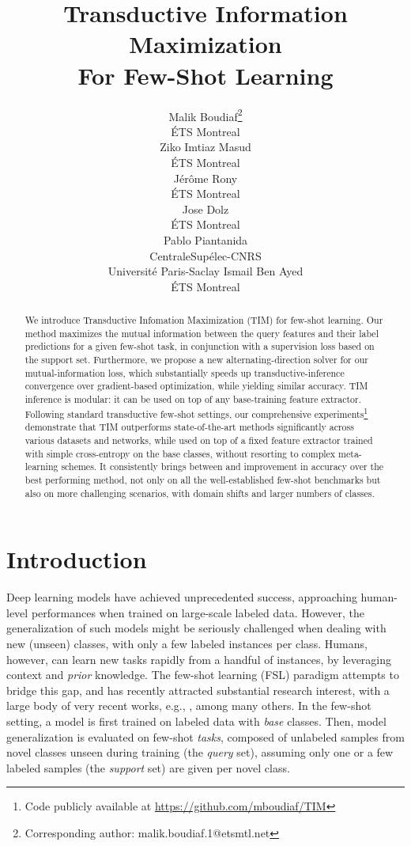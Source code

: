 \documentclass{article}
\title{Transductive Information Maximization \\ For Few-Shot Learning}
\author{Malik Boudiaf\thanks{Corresponding author: malik.boudiaf.1@etsmtl.net} \\
  \'ETS Montreal \\
\And
  Ziko Imtiaz Masud \\
  \'ETS Montreal \\
  \And
  Jérôme Rony \\
  \'ETS Montreal \\
  \AND
  Jose Dolz \\
  \'ETS Montreal \\
  \And
  Pablo Piantanida \\
  CentraleSup\'elec-CNRS \\ Universit\'e Paris-Saclay 
  \And
  Ismail Ben Ayed \\
  \'ETS Montreal \\
}
\begin{document}
\maketitle
\begin{abstract}


We introduce Transductive Infomation Maximization (TIM) for few-shot learning. Our method maximizes the mutual information between the query features and their label predictions for a given few-shot task, in conjunction with a supervision loss based on the support set. Furthermore, we propose a new alternating-direction solver for our mutual-information loss, which substantially speeds up transductive-inference convergence over gradient-based optimization, while yielding similar accuracy. 
TIM inference is modular: it can be used on top of any base-training feature extractor. 
Following standard transductive few-shot settings, our comprehensive experiments\footnote{Code publicly available at \url{https://github.com/mboudiaf/TIM}} demonstrate that TIM outperforms state-of-the-art methods significantly across various datasets and networks, while used on top of a fixed feature extractor trained with simple cross-entropy on the base classes, without resorting to complex meta-learning schemes. It consistently brings between  and  improvement in accuracy over the best performing method, not only on all the well-established few-shot benchmarks but also on more challenging scenarios, with domain shifts and larger numbers of classes.


\end{abstract} 
\section{Introduction}
    Deep learning models have achieved unprecedented success, approaching human-level performances when trained on large-scale labeled data. However, the generalization of such models might be seriously challenged when dealing with new (unseen) classes, with only a few labeled instances per class. Humans, however, can learn new tasks rapidly from a handful of instances, by leveraging context and \emph{prior} knowledge. The few-shot learning (FSL) paradigm \cite{miller2000learning,fei2006one,matching_net} attempts to bridge this gap, and has recently attracted substantial research interest, with a large body of very recent works, e.g., \cite{can,dhillon2019baseline,leo,feat,liu2018learning,closer_look,team,kim2019edge,relation_net,inat_benchmark,gidaris2019boosting,prototypical_nets,maml}, among many others. In the few-shot setting, a model is first trained on labeled data with {\em base} classes. Then, model generalization is evaluated on few-shot {\em tasks}, composed of unlabeled samples from novel classes unseen during training (the {\em query} set), assuming only one or a few labeled samples (the {\em support} set) are given per novel class. 
    
\end{document}
